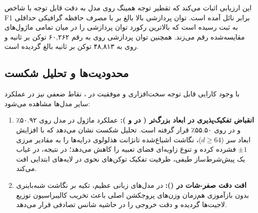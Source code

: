 این ارزیابی اثبات می‌کند که تقطیر توجه همینگ روی مدل  به دقت قابل توجه  با شاخص F1 برابر  نائل آمده است. توان پردازشی بالا بالغ بر  با مصرف حافظه گرافیکی حداقلی  به ثبت رسیده است که بالاترین رکورد توان پردازشی را در میان تمامی ماژول‌های مقایسه‌شده رقم می‌زند. همچنین توان پردازشی روی  به رقم ۶۰,۲۶۲ توکن بر ثانیه و روی  به ۴۸,۸۱۳ توکن بر ثانیه بالغ گردیده است.

\subsection{محدودیت‌ها و تحلیل شکست}
با وجود کارایی قابل توجه سخت‌افزاری و موفقیت در ، نقاط ضعفی نیز در عملکرد سایر مدل‌ها مشاهده می‌شود:
\begin{enumerate}
    \item \textbf{انقباض تفکیک‌پذیری در ابعاد بزرگ‌تر ( در  و ):} عملکرد ماژول در مدل  روی ۵۰.۹۲٪ و در  روی ۵۵.۵۰٪ قرار گرفته است. تحلیل شکست نشان می‌دهد که با افزایش ابعاد سر ($d \ge 64$)، نگاشت اشباع‌شده تانژانت هذلولوی درایه‌ها را به مقادیر مرزی $\pm 1$ فشرده کرده و تنوع زاویه‌ای فضای تعبیه را کاهش می‌دهد؛ در نتیجه، در غیاب یک پیش‌شرط‌ساز طیفی، ظرفیت تفکیک توکن‌های نحوی در لایه‌های ابتدایی افت می‌کند.
    \item \textbf{افت دقت صفر-شات در  ():} در مدل‌های زبانی عظیم، تکیه بر نگاشت شبه‌باینری بدون بازآموزی هم‌زمان وزن‌های پروجکشن اصلی باعث تخریب کالیبراسیون توزیع لاجیت‌ها گردیده و دقت خروجی را در حاشیه شانس تصادفی قرار می‌دهد.
\end{enumerate}
